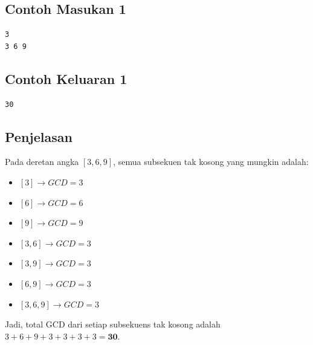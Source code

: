 \documentclass{article}
\begin{document}
\begin{multicols}{2}
\subsection*{Contoh Masukan 1}
\begin{lstlisting}
3
3 6 9
\end{lstlisting}
\columnbreak
\subsection*{Contoh Keluaran 1}
\begin{lstlisting}
30
\end{lstlisting}
\vfill
\null
\end{multicols}


\subsection*{Penjelasan}

Pada deretan angka $[3, 6, 9]$, semua subsekuen tak kosong yang mungkin adalah:

\begin{itemize}
    \item $[3] \rightarrow GCD = 3$
    \item $[6] \rightarrow GCD = 6$
    \item $[9] \rightarrow GCD = 9$
    \item $[3, 6] \rightarrow GCD = 3$
    \item $[3, 9] \rightarrow GCD = 3$
    \item $[6, 9] \rightarrow GCD = 3$
    \item $[3, 6, 9] \rightarrow GCD = 3$
\end{itemize}

Jadi, total GCD dari setiap subsekuens tak kosong adalah $3 + 6 + 9 + 3 + 3 + 3 + 3 = \textbf{30}$.
\end{document}

